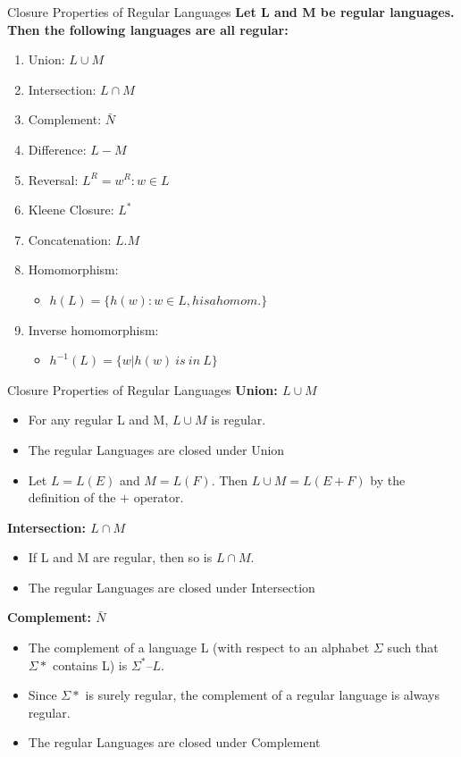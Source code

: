 \documentclass{beamer}
\begin{document}
\begin{frame}{Closure Properties of Regular Languages}
	\textbf{Let L and M be regular languages. Then the
		following languages are all regular:
}
\begin{enumerate}
	\item Union: $L \cup M$
	\item Intersection: $L \cap M$
	\item Complement: $\bar{N}$
	\item Difference: $L - M$
	\item Reversal: $L^R = {w^R : w \in L}$
	\item Kleene Closure: $L^*$
	\item Concatenation: $L.M$
	\item Homomorphism:
	\begin{itemize}
		\item $h(L) = \{h(w) : w \in L, h is a homom. \}$
	\end{itemize}
\item Inverse homomorphism:
\begin{itemize}
	\item $	h^{-1}(L) = \{w \big| h(w) \ is \ in \ L\}$
\end{itemize}
\end{enumerate}
\end{frame}
\begin{frame}{Closure Properties of Regular Languages}
	\textbf{Union: $L \cup M$}
	\begin{itemize}
		\item  For any regular L and M, $L\cup M$ is regular.
		\item The regular Languages are closed under Union
		\item Let $L=L(E)$ and	$M=	L(F)$. Then	$L\cup M =	L(E+F)$ by the definition of the $+$ operator.
	\end{itemize}
	\textbf{Intersection: $L \cap M$}
\begin{itemize}
	\item If L and M are regular, then	so is $L \cap M.$
	\item The regular Languages are closed under Intersection
\end{itemize}
\textbf{Complement: $\bar{N}$}
\begin{itemize}
	\item The complement of a language L (with respect to an alphabet $\Sigma$ such that $\Sigma*$ contains L) is $\Sigma^* – L$.
	\item Since $\Sigma*$ is surely regular, the complement of a regular language is always regular.
	\item The regular Languages are closed under Complement
\end{itemize}
\end{frame}
\end{document}
